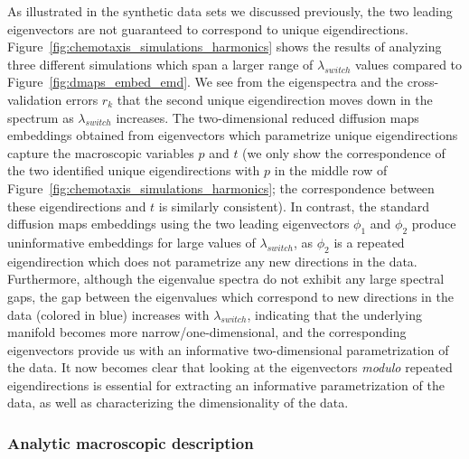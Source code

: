 As illustrated in the synthetic data sets we discussed previously, the two leading eigenvectors are not guaranteed to correspond to unique eigendirections.
%
Figure~\ref{fig:chemotaxis_simulations_harmonics} shows the results of analyzing three different simulations which span a larger range of $\lambda_{switch}$ values compared to Figure~\ref{fig:dmaps_embed_emd}.
%
We see from the eigenspectra and the cross-validation errors $r_k$ that the second unique eigendirection moves down in the spectrum as $\lambda_{switch}$ increases.
%
The two-dimensional reduced diffusion maps embeddings obtained from eigenvectors which parametrize unique eigendirections capture the macroscopic variables $p$ and $t$ (we only show the correspondence of the two identified unique eigendirections with $p$ in the middle row of Figure~\ref{fig:chemotaxis_simulations_harmonics}; the correspondence between these eigendirections and $t$ is similarly consistent).
%
In contrast, the standard diffusion maps embeddings using the two leading eigenvectors $\phi_1$ and $\phi_2$ produce uninformative embeddings for large values of $\lambda_{switch}$, as $\phi_2$ is a repeated eigendirection which does not parametrize any new directions in the data.
%
Furthermore, although the eigenvalue spectra do not exhibit any large spectral gaps, the gap between the eigenvalues which correspond to new directions in the data (colored in blue) increases with $\lambda_{switch}$, indicating that the underlying manifold becomes more narrow/one-dimensional, and the corresponding eigenvectors provide us with an informative two-dimensional parametrization of the data. %
%
It now becomes clear that looking at the eigenvectors {\em modulo} repeated eigendirections is essential for extracting an informative parametrization of the data, as well as characterizing the dimensionality of the data.

\subsubsection{Analytic macroscopic description}

